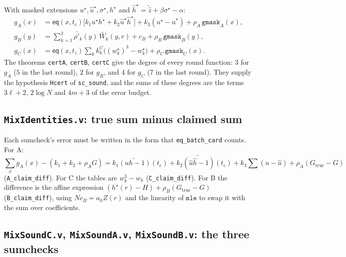 \documentclass[11pt,a4paper]{article}
\newcommand{\eq}{\mathsf{eq}}
\newcommand{\mle}[1]{\widetilde{#1}}
\newcommand{\msk}[1]{#1^{\star}}
\newcommand{\uh}{\hat{u}}
\newcommand{\hh}{\hat{h}}
\newcommand{\zh}{\hat{z}}
\theoremstyle{definition}
\theoremstyle{plain}
\begin{document}
With masked extensions $\msk u,\msk{\uh},\msk\sigma,\msk h$ and
$\msk{\hh}=\mle{\zh}+\beta\msk\sigma-\alpha$:
\begin{align*}
  g_A(x)&=\eq(x,t_c)\bigl[k_1\msk u\msk h+k_2\msk{\uh}\msk{\hh}\bigr]+k_3(\msk u-\msk{\uh})+\rho_A\,\mathtt{gmask}_A(x),\\
  g_B(y)&=\textstyle\sum_{k=1}^3\mle{\rho'_k}(y)\,\mle{W_k}(y,r)+c_B+\rho_B\,\mathtt{gmask}_B(y),\\
  g_C(x)&=\eq(x,t_z)\textstyle\sum_{k}k^C_k\bigl((\msk{w_k})^3-\msk{w_k}\bigr)+\rho_C\,\mathtt{gmask}_C(x).
\end{align*}
The theorems \texttt{certA}, \texttt{certB}, \texttt{certC} give the degree of every round function:
$3$ for $g_A$ ($5$ in the last round), $2$ for $g_B$, and $4$ for $g_C$ ($7$ in the last round). They
supply the hypothesis \texttt{Hcert} of \texttt{sc\_sound}, and the sums of these degrees are the
terms $3\ell+2$, $2\log N$ and $4m+3$ of the error budget.

\subsection{\texttt{MixIdentities.v}: true sum minus claimed sum}

Each sumcheck's error must be written in the form that \texttt{eq\_batch\_card} counts. For A:
\[
  \sum_x g_A(x)-(k_1+k_2+\rho_AG)=
  k_1\mle{(uh-1)}(t_c)+k_2\mle{(\uh\hh-1)}(t_c)+k_3\textstyle\sum(u-\uh)+\rho_A(G_{\mathrm{true}}-G)
\]
(\texttt{A\_claim\_diff}). For C the tables are $w_k^3-w_k$ (\texttt{C\_claim\_diff}). For B the
difference is the affine expression $(\msk h(r)-H)+\rho_B(G_{\mathrm{true}}-G)$ (\texttt{B\_claim\_diff}),
using $Nc_B=a_hZ(r)$ and the linearity of $\mathtt{mle}$ to swap it with the sum over coefficients.

\subsection{\texttt{MixSoundC.v}, \texttt{MixSoundA.v}, \texttt{MixSoundB.v}: the three sumchecks}
\end{document}
